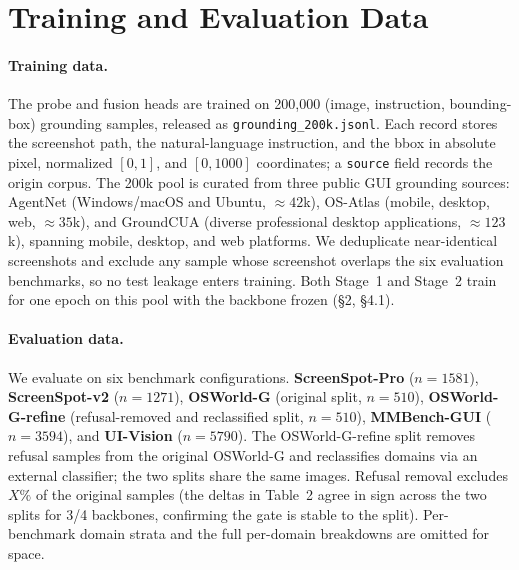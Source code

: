 
\section{Training and Evaluation Data}
\label{app:data}

\paragraph{Training data.}
The probe and fusion heads are trained on 200{,}000 (image, instruction, bounding-box) grounding samples, released as \texttt{grounding\_200k.jsonl}. Each record stores the screenshot path, the natural-language instruction, and the bbox in absolute pixel, normalized $[0,1]$, and $[0,1000]$ coordinates; a \texttt{source} field records the origin corpus. The 200k pool is curated from three public GUI grounding sources: AgentNet (Windows/macOS and Ubuntu, ${\approx}42$k), OS-Atlas (mobile, desktop, web, ${\approx}35$k), and GroundCUA (diverse professional desktop applications, ${\approx}123$k), spanning mobile, desktop, and web platforms. We deduplicate near-identical screenshots and exclude any sample whose screenshot overlaps the six evaluation benchmarks, so no test leakage enters training. Both Stage~1 and Stage~2 train for one epoch on this pool with the backbone frozen (\S2, \S4.1).

\paragraph{Evaluation data.}
We evaluate on six benchmark configurations. \textbf{ScreenSpot-Pro} ($n{=}1581$), \textbf{ScreenSpot-v2} ($n{=}1271$), \textbf{OSWorld-G} (original split, $n{=}510$), \textbf{OSWorld-G-refine} (refusal-removed and reclassified split, $n{=}510$), \textbf{MMBench-GUI} ($n{=}3594$), and \textbf{UI-Vision} ($n{=}5790$). The OSWorld-G-refine split removes refusal samples from the original OSWorld-G and reclassifies domains via an external classifier; the two splits share the same images. Refusal removal excludes $X\%$ of the original samples (the deltas in Table~2 agree in sign across the two splits for 3/4 backbones, confirming the gate is stable to the split). Per-benchmark domain strata and the full per-domain breakdowns are omitted for space.

